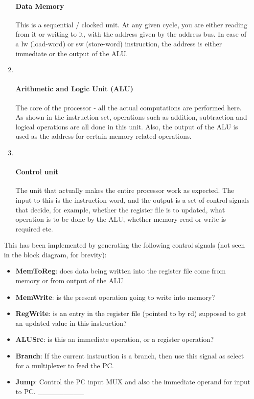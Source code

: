 \documentclass[11pt]{article}
\providecommand{\tightlist}{%
      \setlength{\itemsep}{0pt}\setlength{\parskip}{0pt}}
\begin{document}
\begin{enumerate}
  \paragraph{Data Memory}\label{data-memory}

  This is a sequential / clocked unit. At any given cycle, you are
  either reading from it or writing to it, with the address given by the
  address bus. In case of a lw (load-word) or sw (store-word)
  instruction, the address is either immediate or the output of the ALU.
\item ~
  \paragraph{Arithmetic and Logic Unit
  (ALU)}\label{arithmetic-and-logic-unit-alu}

  The core of the processor - all the actual computations are performed
  here. As shown in the instruction set, operations such as addition,
  subtraction and logical operations are all done in this unit. Also,
  the output of the ALU is used as the address for certain memory
  related operations.
\item ~
  \paragraph{Control unit}\label{control-unit}

  The unit that actually makes the entire processor work as expected.
  The input to this is the instruction word, and the output is a set of
  control signals that decide, for example, whether the register file is
  to updated, what operation is to be done by the ALU, whether memory
  read or write is required etc.
\end{enumerate}

This has been implemented by generating the following control signals
(not seen in the block diagram, for brevity):

\begin{itemize}
\tightlist
\item
  \textbf{MemToReg}: does data being written into the register file come
  from memory or from output of the ALU
\item
  \textbf{MemWrite}: is the present operation going to write into
  memory?
\item
  \textbf{RegWrite}: is an entry in the register file (pointed to by rd)
  supposed to get an updated value in this instruction?
\item
  \textbf{ALUSrc}: is this an immediate operation, or a register
  operation?
\item
  \textbf{Branch}: If the current instruction is a branch, then use this
  signal as select for a multiplexer to feed the PC.
\item
  \textbf{Jump}: Control the PC input MUX and also the immediate operand
  for input to PC. \_\_\_\_\_\_\_\_\_
\end{itemize}
\end{document}
